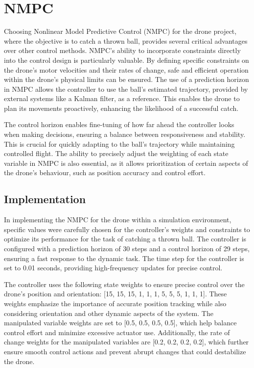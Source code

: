 \documentclass{UoNMCHA}
\numberwithin{equation}{section}
\begin{document}
\section{NMPC}
Choosing Nonlinear Model Predictive Control (NMPC) for the drone project, where the objective is to catch a thrown ball, provides several critical advantages over other control methods. NMPC's ability to incorporate constraints directly into the control design is particularly valuable. By defining specific constraints on the drone's motor velocities and their rates of change, safe and efficient operation within the drone's physical limits can be ensured. The use of a prediction horizon in NMPC allows the controller to use the ball's estimated trajectory, provided by external systems like a Kalman filter, as a reference. This enables the drone to plan its movements proactively, enhancing the likelihood of a successful catch.

The control horizon enables fine-tuning of how far ahead the controller looks when making decisions, ensuring a balance between responsiveness and stability. This is crucial for quickly adapting to the ball's trajectory while maintaining controlled flight. The ability to precisely adjust the weighting of each state variable in NMPC is also essential, as it allows prioritization of certain aspects of the drone's behaviour, such as position accuracy and control effort.
\subsection{Implementation}

In implementing the NMPC for the drone within a simulation environment, specific values were carefully chosen for the controller's weights and constraints to optimize its performance for the task of catching a thrown ball. The controller is configured with a prediction horizon of 30 steps and a control horizon of 29 steps, ensuring a fast response to the dynamic task. The time step for the controller is set to 0.01 seconds, providing high-frequency updates for precise control.

The controller uses the following state weights to ensure precise control over the drone's position and orientation: [15, 15, 15, 1, 1, 1, 5, 5, 5, 1, 1, 1]. These weights emphasize the importance of accurate position tracking while also considering orientation and other dynamic aspects of the system. The manipulated variable weights are set to [0.5, 0.5, 0.5, 0.5], which help balance control effort and minimize excessive actuator use. Additionally, the rate of change weights for the manipulated variables are [0.2, 0.2, 0.2, 0.2], which further ensure smooth control actions and prevent abrupt changes that could destabilize the drone.
\end{document}
